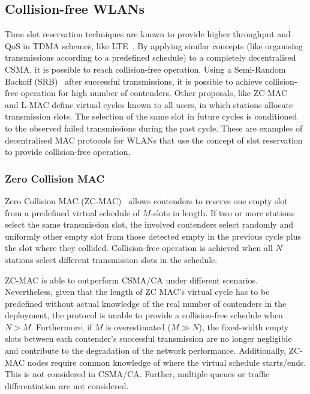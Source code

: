 \documentclass[a4paper]{article}
\begin{document}
\subsection{Collision-free WLANs}
Time slot reservation techniques are known to provide higher throughput and QoS in TDMA schemes, like LTE~\cite{canoLTEcoexistence}. By applying similar concepts (like organising transmissions according to a predefined schedule) to a completely decentralised CSMA, it is possible to reach collision-free operation. Using a Semi-Random Backoff (SRB)~\cite{HE} after successful transmissions, it is possible to achieve collision-free operation for high number of contenders. Other proposals, like ZC-MAC~\cite{ZMAC} and L-MAC\cite{L_MAC} define virtual cycles known to all users, in which stations allocate transmission slots. The selection of the same slot in future cycles is conditioned to the observed failed transmissions during the past cycle. These are examples of decentralised MAC protocols for WLANs that use the concept of slot reservation to provide collision-free operation.

\subsubsection{Zero Collision MAC}
Zero Collision MAC (ZC-MAC)~\cite{ZMAC} allows contenders to reserve one empty slot from a predefined virtual schedule of $M$-slots in length. If two or more stations select the same transmission slot, the involved contenders select randomly and uniformly other empty slot from those detected empty in the previous cycle plus the slot where they collided. Collision-free operation is achieved when all $N$ stations select different transmission slots in the schedule.

ZC-MAC is able to outperform CSMA/CA under different scenarios. Nevertheless, given that the length of ZC MAC's virtual cycle has to be predefined without actual knowledge of the real number of contenders in the deployment, the protocol is unable to provide a collision-free schedule when $N>M$. Furthermore, if $M$ is overestimated ($M\gg N$), the fixed-width empty slots between each contender's successful transmission are no longer negligible and contribute to the degradation of the network performance. Additionally, ZC-MAC nodes require common knowledge of where the virtual schedule starts/ends. This is not considered in CSMA/CA. Further, multiple queues or traffic differentiation are not considered.
\end{document}
